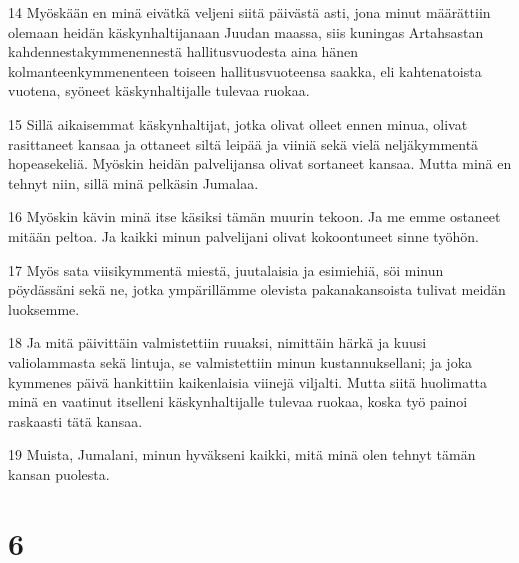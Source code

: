 \par 14 Myöskään en minä eivätkä veljeni siitä päivästä asti, jona minut määrättiin olemaan heidän käskynhaltijanaan Juudan maassa, siis kuningas Artahsastan kahdennestakymmenennestä hallitusvuodesta aina hänen kolmanteenkymmenenteen toiseen hallitusvuoteensa saakka, eli kahtenatoista vuotena, syöneet käskynhaltijalle tulevaa ruokaa.
\par 15 Sillä aikaisemmat käskynhaltijat, jotka olivat olleet ennen minua, olivat rasittaneet kansaa ja ottaneet siltä leipää ja viiniä sekä vielä neljäkymmentä hopeasekeliä. Myöskin heidän palvelijansa olivat sortaneet kansaa. Mutta minä en tehnyt niin, sillä minä pelkäsin Jumalaa.
\par 16 Myöskin kävin minä itse käsiksi tämän muurin tekoon. Ja me emme ostaneet mitään peltoa. Ja kaikki minun palvelijani olivat kokoontuneet sinne työhön.
\par 17 Myös sata viisikymmentä miestä, juutalaisia ja esimiehiä, söi minun pöydässäni sekä ne, jotka ympärillämme olevista pakanakansoista tulivat meidän luoksemme.
\par 18 Ja mitä päivittäin valmistettiin ruuaksi, nimittäin härkä ja kuusi valiolammasta sekä lintuja, se valmistettiin minun kustannuksellani; ja joka kymmenes päivä hankittiin kaikenlaisia viinejä viljalti. Mutta siitä huolimatta minä en vaatinut itselleni käskynhaltijalle tulevaa ruokaa, koska työ painoi raskaasti tätä kansaa.
\par 19 Muista, Jumalani, minun hyväkseni kaikki, mitä minä olen tehnyt tämän kansan puolesta.

\chapter{6}

